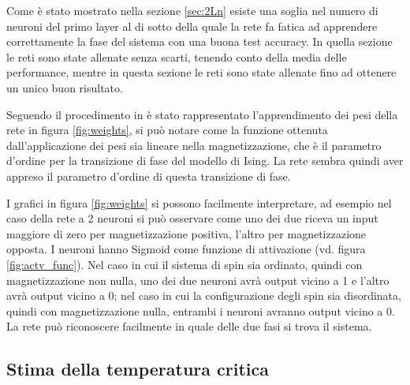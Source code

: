 \documentclass{article}
\begin{document}
Come è stato mostrato nella sezione \ref{sec:2Ln} esiste una soglia nel numero di neuroni del primo layer al di sotto della quale la rete fa fatica ad apprendere correttamente la fase del sistema con una buona test accuracy.
In quella sezione le reti sono state allenate senza scarti, tenendo conto della media delle performance, mentre in questa sezione le reti sono state allenate fino ad ottenere un unico buon risultato.

Seguendo il procedimento in \cite{carrasqu} è stato rappresentato l'apprendimento dei pesi della rete in figura \ref{fig:weights}, si può notare come la funzione ottenuta dall'applicazione dei pesi sia lineare nella magnetizzazione, che è il parametro d'ordine per la transizione di fase del modello di Ising.
La rete sembra quindi aver appreso il parametro d'ordine di questa transizione di fase.

I grafici in figura \ref{fig:weights} si possono facilmente interpretare, ad esempio nel caso della rete a 2 neuroni si può osservare come uno dei due riceva un input maggiore di zero per magnetizzazione positiva, l'altro per magnetizzazione opposta.
I neuroni hanno Sigmoid come funzione di attivazione (vd. figura \ref{fig:actv_func}).
Nel caso in cui il sistema di spin sia ordinato, quindi con magnetizzazione non nulla, uno dei due neuroni avrà output vicino a 1 e l'altro avrà output vicino a 0; nel caso in cui la configurazione degli spin sia disordinata, quindi con magnetizzazione nulla, entrambi i neuroni avranno output vicino a 0.
La rete può riconoscere facilmente in quale delle due fasi si trova il sistema.

\subsection{Stima della temperatura critica}
\end{document}
